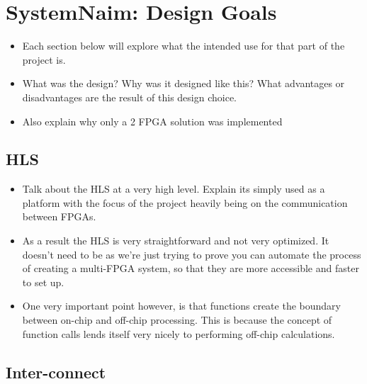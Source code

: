 \chapter{SystemNaim: Design Goals}

\begin{itemize}
    \item Each section below will explore what the intended use for that part of the project is.
    \item What was the design? Why was it designed like this? What advantages or disadvantages are the result of this design choice.
    \item Also explain why only a 2 FPGA solution was implemented
\end{itemize}

\section{HLS}

\begin{itemize}
    \item Talk about the HLS at a very high level. Explain its simply used as a platform with the focus of the project heavily being on the communication between FPGAs.
    \item As a result the HLS is very straightforward and not very optimized. It doesn't need to be as we're just trying to prove you can automate the process of creating a multi-FPGA system, so that they are more accessible and faster to set up.
    \item One very important point however, is that functions create the boundary between on-chip and off-chip processing. This is because the concept of function calls lends itself very nicely to performing off-chip calculations.
\end{itemize}

\section{Inter-connect}


